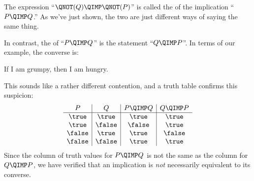 The expression ``$\QNOT(Q) \QIMP \QNOT(P)$'' is called the
 of the implication ``$P \QIMP Q$.''  As we've
just shown, the two are just different ways of saying the same thing.

In contrast, the  of ``$P \QIMP Q$'' is the statement
``$Q \QIMP P$''.  In terms of our example, the converse is:
%
\begin{center}
If I am grumpy, then I am hungry.
\end{center}
%
This sounds like a rather different contention, and a truth table
confirms this suspicion:
%
\[
\begin{array}{c|c|c|c}
P & Q &
    P \QIMP Q &
    Q \QIMP P \\ \hline
\true & \true & \true & \true \\
\true & \false & \false & \true \\
\false & \true & \true & \false \\
\false & \false & \true & \true
\end{array}
\]
%
 Since the column of truth values for $P
\QIMP Q$ is not the same as the column for $Q \QIMP P$, we have verified
that an implication is \emph{not} necessarily equivalent to its converse.

